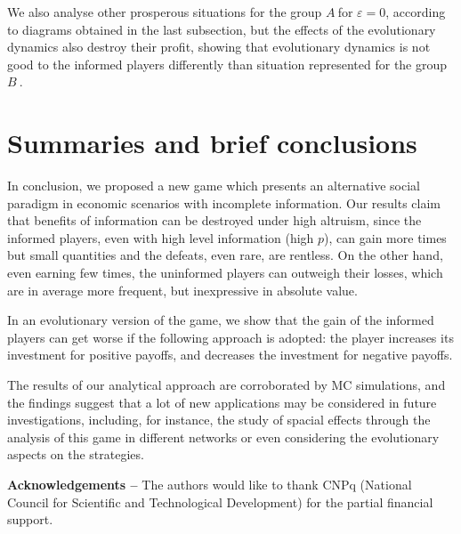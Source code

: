 \documentclass[3p, 11pt]{elsarticle}
\begin{document}
We also analyse other prosperous situations for the group $A\ $for $%
\varepsilon =0$, according to diagrams obtained in the last subsection, but
the effects of the evolutionary dynamics also destroy their profit, showing
that evolutionary dynamics is not good to the informed players differently than 
situation represented for the group $B\ $.  

\section{Summaries and brief conclusions}

\label{Sec:Conclusions}

In conclusion, we proposed a new game which presents an alternative social
paradigm in economic scenarios with incomplete information. Our results
claim that benefits of information can be destroyed under high altruism,
since the informed players, even with high level information (high $p$), can
gain more times but small quantities and the defeats, even rare, are
rentless. On the other hand, even earning few times, the uninformed players
can outweigh their losses, which are in average more frequent, but
inexpressive in absolute value.

In an evolutionary version of the game, we show that the gain of the
informed players can get worse if the following approach is adopted: the
player increases its investment for positive payoffs, and decreases the
investment for negative payoffs.

The results of our analytical approach are corroborated by MC simulations,
and the findings suggest that a lot of new applications may be considered in
future investigations, including, for instance, the study of spacial effects
through the analysis of this game in different networks or even considering
the evolutionary aspects on the strategies.

\textbf{Acknowledgements --} The authors would like to thank CNPq (National
Council for Scientific and Technological Development) for the partial
financial support.
\end{document}
